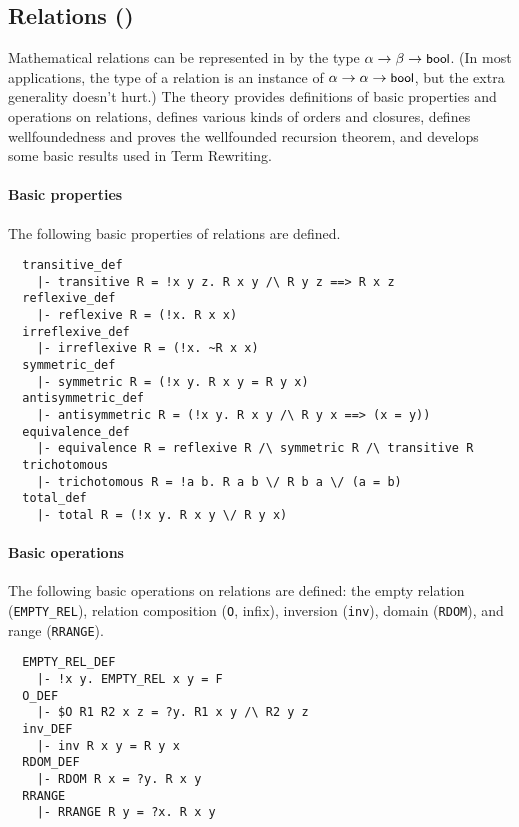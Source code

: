 \subsection{Relations ()}\label{relation}

Mathematical relations can be represented in \HOL{} by the type
$\alpha \to\beta\to\mbox{\small{\textbf{\sf{bool}}}}$. (In most applications, the type of a
relation is an instance of $\alpha \to\alpha\to\mbox{\small{\textbf{\sf{bool}}}}$, but the
extra generality doesn't hurt.) The theory 
provides definitions of basic properties and operations on relations,
defines various kinds of orders and closures, defines wellfoundedness
and proves the wellfounded recursion theorem, and develops some
basic results used in Term Rewriting.

\paragraph {Basic properties}

The following basic properties of relations are defined.
%
\begin{hol}
{\small
\begin{verbatim}
  transitive_def
    |- transitive R = !x y z. R x y /\ R y z ==> R x z
  reflexive_def
    |- reflexive R = (!x. R x x)
  irreflexive_def
    |- irreflexive R = (!x. ~R x x)
  symmetric_def
    |- symmetric R = (!x y. R x y = R y x)
  antisymmetric_def
    |- antisymmetric R = (!x y. R x y /\ R y x ==> (x = y))
  equivalence_def
    |- equivalence R = reflexive R /\ symmetric R /\ transitive R
  trichotomous
    |- trichotomous R = !a b. R a b \/ R b a \/ (a = b)
  total_def
    |- total R = (!x y. R x y \/ R y x)
\end{verbatim}
}
\end{hol}

\paragraph{Basic operations}

The following basic operations on relations are defined: the empty
relation ({\small\verb+EMPTY_REL+}), relation composition
({\small\verb+O+, infix}), inversion ({\small\verb+inv+}),
domain ({\small\verb+RDOM+}), and range ({\small\verb+RRANGE+}).
%
\begin{hol}
{\small
\begin{verbatim}
  EMPTY_REL_DEF
    |- !x y. EMPTY_REL x y = F
  O_DEF
    |- $O R1 R2 x z = ?y. R1 x y /\ R2 y z
  inv_DEF
    |- inv R x y = R y x
  RDOM_DEF
    |- RDOM R x = ?y. R x y
  RRANGE
    |- RRANGE R y = ?x. R x y
\end{verbatim}
}
\end{hol}

